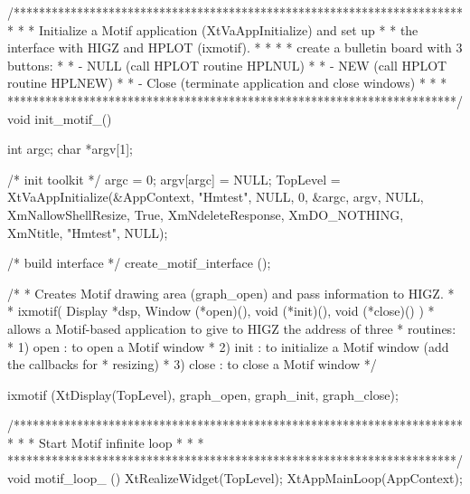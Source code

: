 /***********************************************************************
 *                                                                     *
 *   Initialize a Motif application (XtVaAppInitialize) and set up     *
 *   the interface with HIGZ and HPLOT (ixmotif).                      *
 *                                                                     *
 *   create a bulletin board with 3 buttons:                           *
 *   - NULL (call HPLOT routine HPLNUL)                                *
 *   - NEW  (call HPLOT routine HPLNEW)                                *
 *   - Close (terminate application and close windows)                 *
 *                                                                     *
 ***********************************************************************/
void init_motif_()
{
   int argc;
   char    *argv[1];

   /* init toolkit */
   argc       = 0;
   argv[argc] = NULL;
   TopLevel = XtVaAppInitialize(&AppContext, "Hmtest", NULL, 0,
                                &argc, argv, NULL,
                                XmNallowShellResize, True,
                                XmNdeleteResponse, XmDO_NOTHING,
                                XmNtitle, "Hmtest",
                                NULL);

   /* build interface */
   create_motif_interface ();

   /*
    * Creates Motif drawing area (graph_open) and pass information to HIGZ.
    *
    * ixmotif( Display *dsp, Window (*open)(), void (*init)(), void (*close)() )
    * allows a Motif-based application to give to HIGZ the address of three
    * routines:
    *    1) open  : to open a Motif window
    *    2) init  : to initialize a Motif window (add the callbacks for
    *               resizing)
    *    3) close : to close a Motif window
    */

   ixmotif (XtDisplay(TopLevel), graph_open, graph_init, graph_close);

}

/***********************************************************************
 *                                                                     *
 *   Start Motif infinite loop                                         *
 *                                                                     *
 ***********************************************************************/
void motif_loop_ ()
{
   XtRealizeWidget(TopLevel);
   XtAppMainLoop(AppContext);
}

